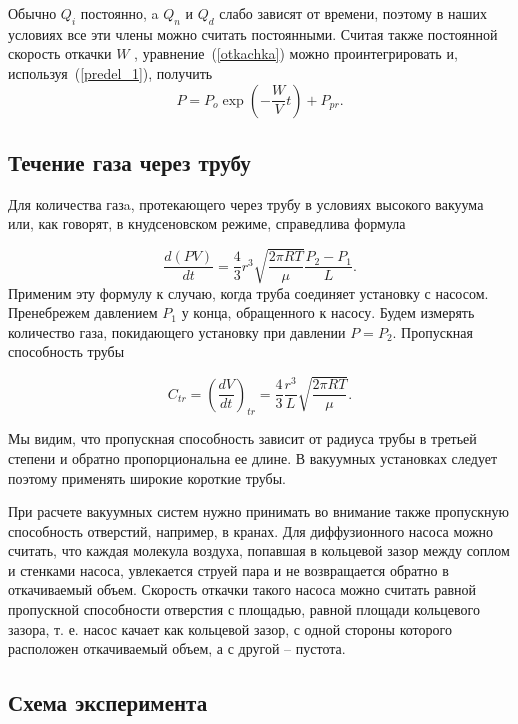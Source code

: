 \documentclass[12pt,a4paper]{article}
\begin{document}
Обычно $Q_i$ постоянно, a $Q_n$ и $Q_d$ слабо зависят от времени, поэтому в наших условиях все эти члены можно считать постоянными. Считая также постоянной скорость откачки $W$ , уравнение~(\ref{otkachka}) можно проинтегрировать и, используя~(\ref{predel_1}), получить
\begin{equation}
\label{davlenie}
	P = P_o \exp{(-\frac{W}{V} t)} + P_{pr}.
\end{equation}

\subsection*{Течение газа через трубу}

Для количества газa, протекающего через трубу в условиях высокого вакуума или, как говорят, в кнудсеновском режиме, справедлива формула

\begin{equation}
\label{formula}
	\frac{d(PV)}{dt}=\frac{4}{3}r^3 \sqrt{\frac{2\pi RT}{\mu}} \frac{P_2-P_1}{L}.
\end{equation}
Применим эту формулу к случаю, когда труба соединяет установку с насосом.
Пренебрежем давлением $P_1$ у конца, обращенного к насосу. Будем измерять количество газа, покидающего установку при давлении $P = P_2$. Пропускная способность трубы

\begin{equation}
	C_{tr}=(\frac{dV}{dt})_{tr}=\frac{4}{3}\frac{r^3}{L}\sqrt{\frac{2\pi RT}{\mu}}.
\end{equation}

	Мы видим, что пропускная способность зависит от радиуса трубы в третьей степени и обратно пропорциональна ее длине. В вакуумных установках следует поэтому применять широкие короткие  трубы.
	
	При расчете вакуумных систем нужно принимать во внимание также пропускную способность отверстий, например, в кранах. Для диффузионного насоса можно считать, что каждая молекула воздуха, попавшая в кольцевой зазор между соплом и стенками насоса, увлекается струей пара и не возвращается обратно в откачиваемый объем. Скорость откачки такого насоса можно считать равной пропускной способности отверстия с площадью, равной площади кольцевого зазора, т. е. насос качает как кольцевой зазор, с одной стороны которого расположен откачиваемый объем, а с другой -- пустота.


\subsection{Схема эксперимента}
\end{document}
